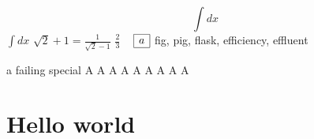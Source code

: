 \documentclass{article}
\begin{document}
\begin{equation}
  \int dx 
\end{equation}
\newpage
$\int dx$
\newpage
$\sqrt2+1=\frac1{\sqrt2-1}$
\newpage
$\frac23$
\newpage
\ 
\newpage
\( \begin{array}{|r|} \hline a \cr \hline \end{array} \)
\newpage
fig, pig, flask, efficiency, effluent
\newpage
{}a failing special
\newpage
\Huge A \LARGE A \Large A \large A \normalsize A \small A
\footnotesize A \scriptsize A \tiny A
\newpage
\pagecolor{blue}\color{yellow}

\section*{Hello world}
\end{document}
